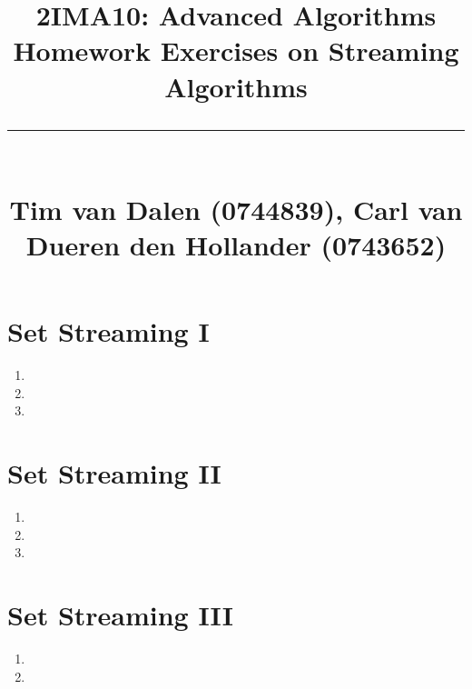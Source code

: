 \documentclass[a4paper,11pt]{article}
\title{
	\huge\raggedright 2IMA10: Advanced Algorithms \hfill\\{\Large Homework Exercises on Streaming Algorithms}\\ \vspace{-0.9\baselineskip}\rule{\linewidth}{1pt}\\
	\small\hfill Tim van Dalen (0744839), Carl van Dueren den Hollander (0743652)
	\normalsize
}
\begin{document}
	\maketitle

	\section*{Set Streaming I}
		\begin{enumerate}
			\item 
			\item 
			\item 
		\end{enumerate}
	\section*{Set Streaming II}
		\begin{enumerate}
			\item 
			\item 
			\item 
		\end{enumerate}
	\section*{Set Streaming III}
		\begin{enumerate}
			\item 
			\item 
		\end{enumerate}
\end{document}
